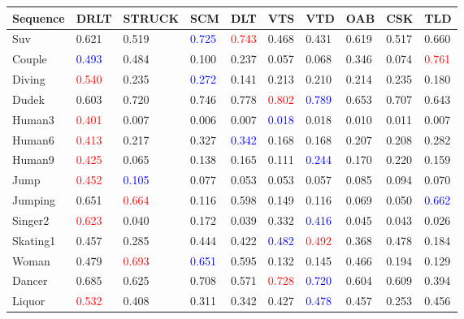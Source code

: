 \documentclass[10pt,twocolumn,letterpaper]{article}
\begin{document}
\begin{table*}
\scriptsize
\begin{center}
\begin{tabular}{|p{1.7cm}|K{1.1cm}|K{1.1cm}|K{1.1cm}|K{1.1cm}|K{1.1cm}|K{1.1cm}|K{1.1cm}|K{1.1cm}|K{1.1cm}|}
\hline
Sequence & DRLT & STRUCK & SCM & DLT & VTS & VTD & OAB & CSK & TLD\\
\hline\hline
Suv      & 0.621  & 0.519  & \textcolor{blue}{0.725} & \textcolor{red}{0.743} & 0.468 & 0.431 & 0.619 & 0.517 & 0.660  \\
Couple   & \textcolor{blue}{0.493}  & 0.484  & 0.100   & 0.237 & 0.057 & 0.068 & 0.346 & 0.074 & \textcolor{red}{0.761} \\
Diving   & \textcolor{red}{0.540}  & 0.235  & \textcolor{blue}{0.272} & 0.141 & 0.213 & 0.210  & 0.214 & 0.235 & 0.180  \\
Dudek    & 0.603   & 0.720   & 0.746 & 0.778 & \textcolor{red}{0.802} & \textcolor{blue}{0.789} & 0.653 & 0.707 & 0.643 \\
Human3   & \textcolor{red}{0.401}   & 0.007  & 0.006 & 0.007 & \textcolor{blue}{0.018} & 0.018 & 0.010  & 0.011 & 0.007 \\
Human6   & \textcolor{red}{0.413}  & 0.217  & 0.327 & \textcolor{blue}{0.342} & 0.168 & 0.168 & 0.207 & 0.208 & 0.282 \\
Human9   & \textcolor{red}{0.425}  & 0.065  & 0.138 & 0.165 & 0.111 & \textcolor{blue}{0.244} & 0.170  & 0.220  & 0.159 \\
Jump     & \textcolor{red}{0.452}  & \textcolor{blue}{0.105}  & 0.077 & 0.053 & 0.053 & 0.057 & 0.085 & 0.094 & 0.070  \\
Jumping  & 0.651 & \textcolor{red}{0.664}  & 0.116 & 0.598 & 0.149 & 0.116 & 0.069 & 0.050  & \textcolor{blue}{0.662} \\
Singer2  & \textcolor{red}{0.623} & 0.040   & 0.172 & 0.039 & 0.332 & \textcolor{blue}{0.416} & 0.045 & 0.043 & 0.026 \\
Skating1 & 0.457 & 0.285  & 0.444 & 0.422 & \textcolor{blue}{0.482} & \textcolor{red}{0.492} & 0.368 & 0.478 & 0.184 \\
Woman    & 0.479 & \textcolor{red}{0.693}  & \textcolor{blue}{0.651} & 0.595 & 0.132 & 0.145 & 0.466 & 0.194 & 0.129 \\
Dancer   & 0.685 & 0.625  & 0.708 & 0.571 & \textcolor{red}{0.728} & \textcolor{blue}{0.720}  & 0.604 & 0.609 & 0.394 \\
Liquor   & \textcolor{red}{0.532} & 0.408  & 0.311 & 0.342 & 0.427 & \textcolor{blue}{0.478} & 0.457 & 0.253 & 0.456 \\

\end{tabular}
\end{center}
\end{table*}
\end{document}
